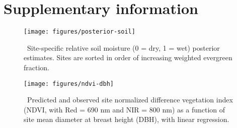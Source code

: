 \section{Supplementary information}

\begin{figure}[ht]
  \centering
  \texttt{[image: figures/posterior-soil]}
  \caption{\label{fig:posterior-soil}\
    Site-specific relative soil moisture (0 = dry, 1 = wet) posterior estimates.
    Sites are sorted in order of increasing weighted evergreen fraction.
  }
\end{figure}

\clearpage

\begin{figure}[ht]
  \centering
  \texttt{[image: figures/ndvi-dbh]}
  \caption{\label{fig:ndvi-dbh}\
    Predicted and observed site normalized difference vegetation index (NDVI, with Red = 690 nm and NIR = 800 nm)
    as a function of site mean diameter at breast height (DBH), with linear regression.
  }
\end{figure}







